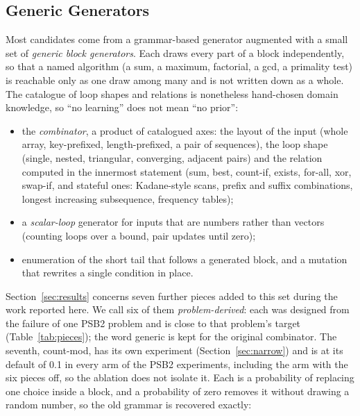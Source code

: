 \documentclass[sigconf,nonacm]{acmart}
\begin{document}
\subsection{Generic Generators}
Most candidates come from a grammar-based generator augmented with a small set of \emph{generic block generators}. Each draws every part of a
block independently, so that a named algorithm (a sum, a maximum, factorial, a gcd, a primality test) is reachable only as one draw among many and
is not written down as a whole. The catalogue of loop shapes and relations is nonetheless hand-chosen domain knowledge, so ``no learning'' does not mean ``no prior'':
\begin{itemize}
  \item the \emph{combinator}, a product of catalogued axes: the layout of the input (whole array, key-prefixed, length-prefixed, a pair of sequences),
        the loop shape (single, nested, triangular, converging, adjacent pairs) and the relation computed in the innermost statement (sum, best,
        count-if, exists, for-all, xor, swap-if, and stateful ones: Kadane-style scans, prefix and suffix combinations, longest increasing subsequence, frequency tables);
  \item a \emph{scalar-loop} generator for inputs that are numbers rather than vectors (counting loops over a bound, pair updates until zero);
  \item enumeration of the short tail that follows a generated block, and a mutation that rewrites a single condition in place.
\end{itemize}
Section~\ref{sec:results} concerns seven further pieces added to this set during the work reported here. We call six of them \emph{problem-derived}: each was designed from the failure of one PSB2 problem and is close to that problem's target (Table~\ref{tab:pieces}); the word generic is kept for the original combinator. The seventh, count-mod, has its own experiment (Section~\ref{sec:narrow}) and is at its default of 0.1 in every arm of the PSB2 experiments, including the arm with the six pieces off, so the ablation does not isolate it. Each is a probability of replacing one
choice inside a block, and a probability of zero removes it without drawing a random number, so the old grammar is recovered exactly:
\end{document}
